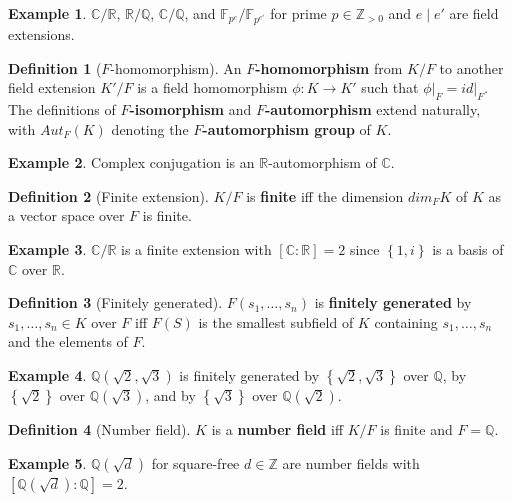 \documentclass{article}
\newcommand{\F}{\mathbb{F}}
\newcommand{\Z}{\mathbb{Z}}
\newcommand{\Q}{\mathbb{Q}}
\newcommand{\R}{\mathbb{R}}
\newcommand{\C}{\mathbb{C}}
\newcommand{\val}[1]{\left. #1 \right\rvert}
\newcommand{\rb}[1]{\left( #1 \right)}
\renewcommand{\sb}[1]{\left[ #1 \right]}
\newcommand{\cb}[1]{\left\{ #1 \right\}}
\theoremstyle{definition}\newtheorem*{definition}{Definition}
\theoremstyle{definition}\newtheorem*{example}{Example}
\theoremstyle{definition}\newtheorem*{remark}{Remark}
\begin{document}
\begin{example}
$ \C / \R $, $ \R / \Q $, $ \C / \Q $, and $ \F_{p^e} / \F_{p^{e'}} $ for prime $ p \in \Z_{> 0} $ and $ e \mid e' $ are field extensions.
\end{example}

\begin{definition}[$ F $-homomorphism]
An \textbf{$ F $-homomorphism} from $ K / F $ to another field extension $ K' / F $ is a field homomorphism $ \phi : K \to K' $ such that $ \val{\phi}_F = \val{id}_F $. The definitions of \textbf{$ F $-isomorphism} and \textbf{$ F $-automorphism} extend naturally, with $ Aut_F\rb{K} $ denoting the \textbf{$ F $-automorphism group} of $ K $.
\end{definition}

\begin{example}
Complex conjugation is an $ \R $-automorphism of $ \C $.
\end{example}

\begin{definition}[Finite extension]
$ K / F $ is \textbf{finite} iff the dimension $ dim_F K $ of $ K $ as a vector space over $ F $ is finite.
\end{definition}

\begin{example}
$ \C / \R $ is a finite extension with $ \sb{\C : \R} = 2 $ since $ \cb{1, i} $ is a basis of $ \C $ over $ \R $.
\end{example}

\begin{definition}[Finitely generated]
$ F\rb{s_1, \dots, s_n} $ is \textbf{finitely generated} by $ s_1, \dots, s_n \in K $ over $ F $ iff $ F\rb{S} $ is the smallest subfield of $ K $ containing $ s_1, \dots, s_n $ and the elements of $ F $.
\end{definition}

\begin{example}
$ \Q\rb{\sqrt{2}, \sqrt{3}} $ is finitely generated by $ \cb{\sqrt{2}, \sqrt{3}} $ over $ \Q $, by $ \cb{\sqrt{2}} $ over $ \Q\rb{\sqrt{3}} $, and by $ \cb{\sqrt{3}} $ over $ \Q\rb{\sqrt{2}} $.
\end{example}

\begin{definition}[Number field]
$ K $ is a \textbf{number field} iff $ K / F $ is finite and $ F = \Q $.
\end{definition}

\begin{example}
$ \Q\rb{\sqrt{d}} $ for square-free $ d \in \Z $ are number fields with $ \sb{\Q\rb{\sqrt{d}} : \Q} = 2 $.
\end{example}
\end{document}

